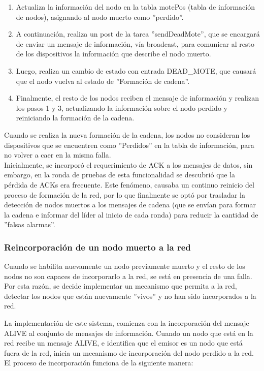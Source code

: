 \begin{enumerate}
\item Actualiza la información del nodo en la tabla motePos (tabla de información de nodos), asignando al nodo muerto como ''perdido''.

\item A continuación, realiza un post de la tarea ''sendDeadMote'', que se encargará de enviar un mensaje de información, vía broadcast, para comunicar al resto de los dispositivos la información que describe el nodo muerto.

\item Luego, realiza un cambio de estado con entrada  DEAD\_MOTE, que causará que el nodo vuelva al estado de ''Formación de cadena''.

\item Finalmente, el resto de los nodos reciben el mensaje de información y realizan los pasos 1 y 3, actualizando la información sobre el nodo perdido y reiniciando la formación de la cadena.
\end{enumerate}

Cuando se realiza la nueva formación de la cadena, los nodos no consideran los dispositivos que se encuentren como ''Perdidos'' en la tabla de información, para no volver a caer en la misma falla.\\

Inicialmente, se incorporó el requerimiento de ACK a los mensajes de datos, sin embargo, en la ronda de pruebas de esta funcionalidad se descubrió que la pérdida de ACKs era frecuente. Este fenómeno, causaba un continuo reinicio del proceso de formación de la red, por lo que finalmente se optó por trasladar la detección de nodos muertos a los mensajes de cadena (que se envían para formar la cadena e informar del líder al inicio de cada ronda) para reducir la cantidad de ''falsas alarmas''.

\subsubsection{Reincorporación de un nodo muerto a la red}
Cuando se habilita nuevamente un nodo previamente muerto y el resto de los nodos no son capaces de incorporarlo a la red, se está en presencia de una falla. Por esta razón, se decide implementar un mecanismo que permita a la red, detectar los nodos que están nuevamente ''vivos'' y no han sido incorporados a la red.

La implementación de este sistema, comienza con la incorporación del mensaje ALIVE al conjunto de mensajes de información. Cuando un nodo que está en la red recibe un mensaje ALIVE, e identifica que el emisor es un nodo que está fuera de la red, inicia un mecanismo de incorporación del nodo perdido a la red. El proceso de incorporación funciona de la siguiente manera:


